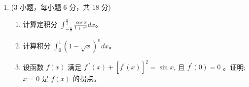 \begin{enumerate}
{\begin{enumerate}
		\item
		\textbf{C}。逐项判断：由 $e^{1/n}-1\sim\frac1n$ 知 A 发散；
		B 由 Dirichlet 判别法收敛，但
		\[
		\sum\frac{|\sin n|}{n}
		\geqslant\sum\frac{\sin^2n}{n},
		\]
		且后者利用 $\sin^2n=(1-\cos2n)/2$ 可知发散，所以
		B 不绝对收敛。对 C，
		\[
		0<\frac1{e^{\sqrt n}+1}<e^{-\sqrt n},
		\]
		而 $\sum e^{-\sqrt n}$ 收敛，故 C 绝对收敛。D 的通项
		绝对值趋于 $\frac12$，不满足通项趋零的必要条件。

		\item
		\textbf{A}。在 $[-\pi,\pi]$ 上对等式两边积分，所有余弦项的积分
		均为零，因此
		\[
		2\pi a+\int_{-\pi}^{\pi}|x|\,dx
		=\int_{-\pi}^{\pi}\pi\,dx,
		\]
		即 $2\pi a+\pi^2=2\pi^2$，从而 $a=\frac\pi2$。
	\end{enumerate}
}


\newpage
\item 
(3 小题，每小题 6 分，共 18 分)
\begin{enumerate}
	\item
计算定积分 $\int_{-\frac{\pi}{2}}^{\frac{\pi}{2}} \frac{\cos x}{1+e^{x}} d x$。
	
	
	\item
	计算积分 $\int_{0}^{1}(1-\sqrt{x})^{n} d x$。
	
	
	\item
	设函数 $f(x)$ 满足 $f^{\prime \prime}(x)+\left[f^{\prime}(x)\right]^{2}=\sin x$, 且 $f^{\prime}(0)=0$ 。证明: $x=0$ 是 $f(x)$ 的拐点。
	
	
	
	
\end{enumerate}



\end{enumerate}
